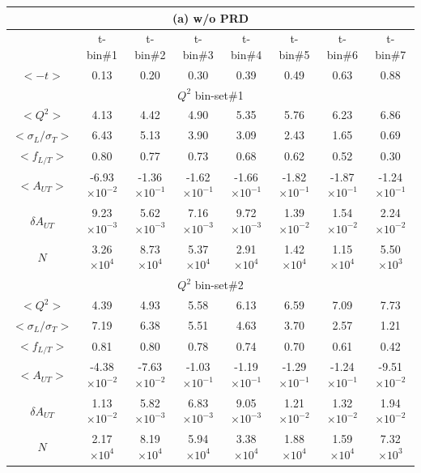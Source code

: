 \begin{table}[!ht]
\centering
 \small
\begin{tabular}{|c|c|c|c|c|c|c|c|}
\multicolumn{8}{c}{ (a) w/o PRD} \\
\hline
       &  t-bin\#1 & t-bin\#2 & t-bin\#3 & t-bin\#4 & t-bin\#5 & t-bin\#6 & t-bin\#7 \\
\hline $<-t>$ &  0.13 &  0.20 & 0.30 & 0.39 & 0.49 & 0.63 & 0.88 \\
\hline
\multicolumn{8}{|c|}{$Q^{2}$ bin-set\#1 } \\
\hline
$<Q^{2}>$      &  4.13 &  4.42 & 4.90 & 5.35 & 5.76 & 6.23 & 6.86 \\
$<\sigma_{L}/\sigma_{T}>$   &  6.43 &  5.13 & 3.90 & 3.09 & 2.43 & 1.65 & 0.69 \\
$<f_{L/T}>$    &  0.80 &  0.77 & 0.73 & 0.68 & 0.62 & 0.52 & 0.30 \\
$<A_{UT}>$     &  -6.93$\times 10^{-2}$ &  -1.36$\times 10^{-1}$ & -1.62$\times 10^{-1}$ &
 -1.66$\times 10^{-1}$ & -1.82$\times 10^{-1}$ & -1.87$\times 10^{-1}$ & -1.24$\times 10^{-1}$ \\               
$\delta A_{UT}$&  9.23$\times 10^{-3}$ &  5.62$\times 10^{-3}$ & 7.16$\times 10^{-3}$ & 
9.72$\times 10^{-3}$ & 1.39$\times 10^{-2}$ & 1.54$\times 10^{-2}$ &  2.24$\times 10^{-2}$ \\
$N$           &  3.26$\times 10^{4}$ &  8.73$\times 10^{4}$ & 5.37$\times 10^{4}$ 
& 2.91$\times 10^{4}$ & 1.42$\times 10^{4}$ & 1.15$\times 10^{4}$ & 5.50$\times 10^{3}$ \\
\hline
\multicolumn{8}{|c|}{$Q^{2}$ bin-set\#2 } \\
\hline 
$<Q^{2}>$     &  4.39 &  4.93 & 5.58 & 6.13 & 6.59 & 7.09 & 7.73 \\
$<\sigma_{L}/\sigma_{T}>$&  7.19 &  6.38 & 5.51 & 4.63 & 3.70 & 2.57 & 1.21 \\
$<f_{L/T}>$   &  0.81 &  0.80 & 0.78 & 0.74 & 0.70 & 0.61 & 0.42 \\
$<A_{UT}>$    &  -4.38$\times 10^{-2}$ &  -7.63$\times 10^{-2}$ & -1.03$\times 10^{-1}$ & 
-1.19$\times 10^{-1}$ & -1.29$\times 10^{-1}$ & -1.24$\times 10^{-1}$ & -9.51$\times 10^{-2}$ \\
$\delta A_{UT}$&  1.13$\times 10^{-2}$ &  5.82$\times 10^{-3}$ & 6.83$\times 10^{-3}$ 
& 9.05$\times 10^{-3}$ & 1.21$\times 10^{-2}$ & 1.32$\times 10^{-2}$ & 1.94$\times 10^{-2}$ \\
$N$          &  2.17$\times 10^{4}$ &  8.19$\times 10^{4}$ & 5.94$\times 10^{4}$ &
  3.38$\times 10^{4}$ & 1.88$\times 10^{4}$ & 1.59$\times 10^{4}$ & 7.32$\times 10^{3}$ \\

\end{tabular}
\end{table}
